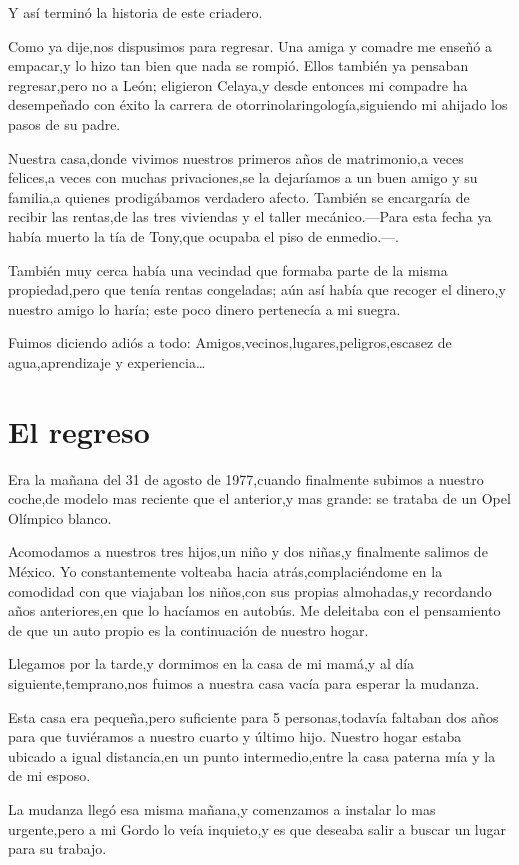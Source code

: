 \documentclass[letterpaper,12pt]{book}
\begin{document}
Y así terminó la historia de este criadero.

Como ya dije,nos dispusimos para regresar. Una amiga y comadre me enseñó a empacar,y lo hizo tan bien que nada se rompió. Ellos también ya pensaban regresar,pero no a León; eligieron Celaya,y desde entonces mi compadre ha desempeñado con éxito la carrera de otorrinolaringología,siguiendo mi ahijado los pasos de su padre.

Nuestra casa,donde vivimos nuestros primeros años de matrimonio,a veces felices,a veces con muchas privaciones,se la dejaríamos a un buen amigo y su familia,a quienes prodigábamos verdadero afecto. También se encargaría de recibir las rentas,de las tres viviendas y el taller mecánico.---Para esta fecha ya había muerto la tía de Tony,que ocupaba el piso de enmedio.---.

También muy cerca había una vecindad que formaba parte de la misma propiedad,pero que tenía rentas congeladas; aún así había que recoger el dinero,y nuestro amigo lo haría; este poco dinero pertenecía a mi suegra.

Fuimos diciendo adiós a todo: Amigos,vecinos,lugares,peligros,escasez de agua,aprendizaje y experiencia\ldots
\chapter{El regreso}
Era la mañana del 31 de agosto de 1977,cuando finalmente subimos a nuestro coche,de modelo mas reciente que el anterior,y mas grande: se trataba de un Opel Olímpico blanco.

Acomodamos a nuestros tres hijos,un niño y dos niñas,y finalmente salimos de México. Yo constantemente volteaba hacia atrás,complaciéndome en la comodidad con que viajaban los niños,con sus propias almohadas,y recordando años anteriores,en que lo hacíamos en autobús. Me deleitaba con el pensamiento de que un auto propio es la continuación de nuestro hogar.

Llegamos por la tarde,y dormimos en la casa de mi mamá,y al día siguiente,temprano,nos fuimos a nuestra casa vacía para esperar la mudanza.

Esta casa era pequeña,pero suficiente para 5 personas,todavía faltaban dos años para que tuviéramos a nuestro cuarto y último hijo. Nuestro hogar estaba ubicado a igual distancia,en un punto intermedio,entre la casa paterna mía y la de mi esposo.

La mudanza llegó esa misma mañana,y comenzamos a instalar lo mas urgente,pero a mi Gordo lo veía inquieto,y es que deseaba salir a buscar un lugar para su trabajo. 
\end{document}
